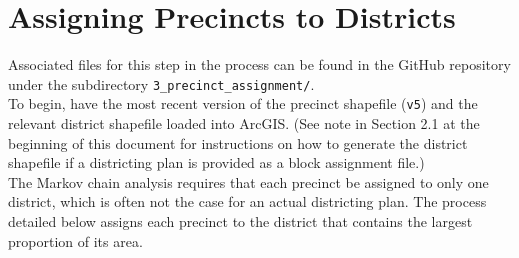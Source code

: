 \documentclass[11pt]{article}
\begin{document}
\section{Assigning Precincts to Districts}

Associated files for this step in the process can be found in the GitHub repository under the subdirectory \verb|3_precinct_assignment/|.\\

To begin, have the most recent version of the precinct shapefile (\verb|v5|) and the relevant district shapefile loaded into ArcGIS. (See note in Section 2.1 at the beginning of this document for instructions on how to generate the district shapefile if a districting plan is provided as a block assignment file.)\\

The Markov chain analysis requires that each precinct be assigned to only one district, which is often not the case for an actual districting plan. The process detailed below assigns each precinct to the district that contains the largest proportion of its area.
\end{document}
